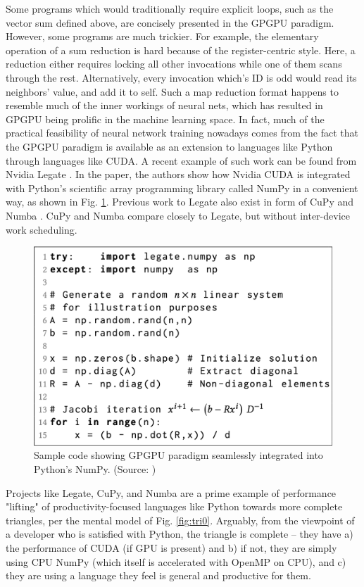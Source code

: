 \documentclass{IEEEtran}
\begin{document}
Some programs which would traditionally require explicit loops, such as the vector sum defined above, are concisely presented in the GPGPU paradigm. However, some programs are much trickier. For example, the elementary operation of a sum reduction is hard because of the register-centric style. Here, a reduction either requires locking all other invocations while one of them scans through the rest. Alternatively, every invocation which's ID is odd would read its neighbors' value, and add it to self. Such a map reduction format happens to resemble much of the inner workings of neural nets, which has resulted in GPGPU being prolific in the machine learning space. In fact, much of the practical feasibility of neural network training nowadays comes from the fact that the GPGPU paradigm is available as an extension to languages like Python through languages like CUDA. A recent example of such work can be found from Nvidia Legate \cite{bauer2019legate}. In the paper, the authors show how Nvidia \gls{CUDA} is integrated with Python's scientific array programming library called NumPy in a convenient way, as shown in Fig. \ref{fig:legint}. Previous work to Legate also exist in form of CuPy \cite{okuta2017cupy} and Numba \cite{lam2015numba}. CuPy and Numba compare closely to Legate, but without inter-device work scheduling.

\begin{figure}
  \centering
  \includegraphics[width=\columnwidth]{./assets/legint.png}
  \caption{Sample code showing GPGPU paradigm seamlessly integrated into Python's NumPy. (Source: \cite{bauer2019legate})}
  \label{fig:legint}
\end{figure}

Projects like Legate, CuPy, and Numba are a prime example of performance "lifting" of productivity-focused languages like Python towards more complete triangles, per the mental model of Fig. \ref{fig:tri0}. Arguably, from the viewpoint of a developer who is satisfied with Python, the triangle is complete -- they have a) the performance of CUDA (if GPU is present) and b) if not, they are simply using CPU NumPy (which itself is accelerated with OpenMP on CPU), and c) they are using a language they feel is general and productive for them.
\end{document}
